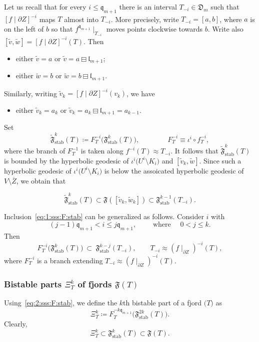 \documentclass{amsart}
\newcommand{\1}{{\mathbb 1 }}
\newcommand{\stab}{{\text{stab}}}
\newcommand{\qq}{\mathfrak{q}}
\newcommand{\length}{{\mathfrak l}}
\newcommand{\Dbb}{{\mathfrak{D}}}
\theoremstyle{remark}
\numberwithin{equation}{section}
\theoremstyle{definition}
\begin{document}
Let us recall that for every $i\le \qq_{m+1}$ there is an interval $T_{-i}\in \Dbb_m$ such that $[f\mid \partial Z]^{-i}$ maps $T$ almost into $T_{-i}$. More precisely, write $T_{-i}=[a,b]$, where $a$ is on the left of $b$ so that $f^{\qq_{m+1}}\mid _{T_{-i}}$ moves points clockwise towards $b$. Write also $[\tilde v,\tilde w]=[f\mid \partial Z]^{-i}(T)$. Then 
\begin{itemize}
    \item either $\tilde v=a$ or $\tilde v = a\boxminus \length_{m+1}$;
    \item either $\tilde w=b$ or $\tilde w = b\boxminus \length_{m+1}$.
\end{itemize}
Similarly, writing $\tilde v_k=[f\mid \partial Z]^{-i}(v_k)$, we have
\begin{itemize}
  \item either $\tilde v_k=a_k$ or $\tilde v_k = a_k\boxminus \length_{m+1}=a_{k-1}$.
\end{itemize}

Set 
\[\widetilde {\mathfrak F}^k_\stab (T)\coloneqq F_T^{-i}\Big(\mathfrak F^k_\stab (T)\Big),\qquad\qquad F_T^{-i}\equiv \iota^{i}\circ f_T^{-i} ,\]
where the branch of $F_T^{-1}$ is taken along $f^{-i}( T)\approx T_{-i}$. It follows that $\widetilde {\mathfrak F}^k_\stab (T)$ is bounded by the hyperbolic geodesic of $\iota^i\big(U^i\setminus K_i\big)$ and $[\tilde v_k, \tilde w]$. Since such a hyperbolic geodesic of $\iota^i\big(U^i\setminus K_i\big)$ is below the assoicated hyperbolic geodesic of $V\setminus \overline Z$, we obtain that

\begin{equation}\label{eq:1:sss:F:stab}
\widetilde {\mathfrak F}^k_\stab (T) \subset \mathfrak F ([\tilde v_k,\tilde w_k])\subset  {\mathfrak F}^{k-1}_\stab (T_{-i}).    
\end{equation}

Inclusion~\eqref{eq:1:sss:F:stab} can be generalized as follows. Consider $i$
 with \[(j-1)\qq_{m+1}< i\le j \qq_{m+1},\qquad \text{ where }\quad 0< j\le k.\]
Then 
\begin{equation}\label{eq:2:sss:F:stab}
 F^{-i}_T \Big(\mathfrak F^k_\stab(T)\Big)\ \subset \  \mathfrak F^{k-j}_\stab(T_{-i}),\qquad T_{-i} \approx (f\mid_{\partial Z}) ^{-i}(T),
\end{equation}
where $ F^{-i}_T$ is a branch extending $T_{-i} \approx (f\mid_{\partial Z}) ^{-i}(T)$.



\subsubsection{Bistable parts $\Xi_T^k$ of fjords $\mathfrak F(T)$} \label{sss:F:bistab}Using~\eqref{eq:2:sss:F:stab}, we define the $k$th bistable part of a fjord $ \mathfrak (T)$ as
\[ \Xi^k_T\coloneqq F^{-k\qq_{m+1}}_T \Big( \mathfrak F_{\stab}^{2k}(T)\Big).\]
Clearly, 
\begin{equation}
    \label{eq:0:sss:F:bistab} \Xi^k_T\subset \mathfrak F^{k}_\stab (T)\subset \mathfrak F(T).
\end{equation}
\end{document}
